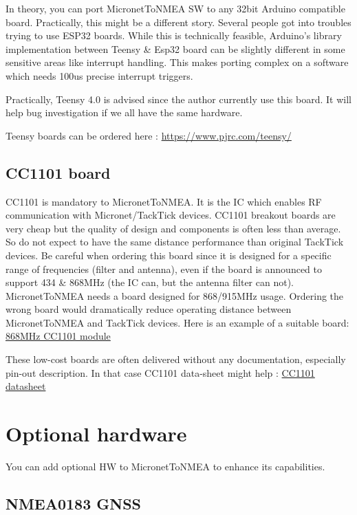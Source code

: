 \documentclass{report}
\begin{document}
In theory, you can port MicronetToNMEA SW to any 32bit Arduino compatible board. Practically, this might be a different story. Several people got into troubles trying to use ESP32 boards. While this is technically feasible, Arduino's library implementation between Teensy \& Esp32 board can be slightly different in some sensitive areas like interrupt handling. This makes porting complex on a software which needs 100us precise interrupt triggers.

Practically, Teensy 4.0 is advised since the author currently use this board. It will help bug investigation if we all have the same hardware.

Teensy boards can be ordered here : \url{https://www.pjrc.com/teensy/}

\subsection{CC1101 board}

CC1101 is mandatory to MicronetToNMEA. It is the IC which enables RF communication with Micronet/TackTick devices. CC1101 breakout boards are very cheap but the quality of design and components is often less than average. So do not expect to have the same distance performance than original TackTick devices. Be careful when ordering this board since it is designed for a specific range of frequencies (filter and antenna), even if the board is announced to support 434 \& 868MHz (the IC can, but the antenna filter can not). MicronetToNMEA needs a board designed for 868/915MHz usage. Ordering the wrong board would dramatically reduce operating distance between MicronetToNMEA and TackTick devices. Here is an example of a suitable board: \href{https://www.amazon.fr/laqiya-cc1101-868-MHz-Transmission-Antenne-Transceiver/dp/B075PFQ57G}{868MHz CC1101 module}

These low-cost boards are often delivered without any documentation, especially pin-out description. In that case CC1101 data-sheet might help : \href{https://www.ti.com/lit/ds/symlink/cc1101.pdf}{CC1101 datasheet}

\section{Optional hardware}

You can add optional HW to MicronetToNMEA to enhance its capabilities.

\subsection{NMEA0183 GNSS}
\end{document}
